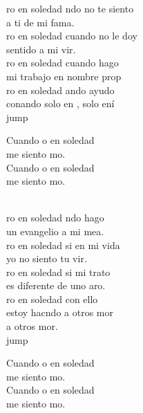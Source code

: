 \begin{cancion}%
	ro en soledad ndo no te siento \\
	a ti de mi fama.\\
	ro en soledad cuando no le doy \\
	sentido a mi vir.\\
	ro en soledad cuando hago \\
	mi trabajo en nombre prop\\
	ro en soledad ando ayudo \\
	conando solo en , solo ení\\jump\\
	\begin{chorus}%
	Cuando o en soledad \\
	me siento mo.\\
	Cuando o en soledad \\
	me siento mo. \\
	\end{chorus}%
	\jump\\
	ro en soledad ndo hago \\
	un evangelio a mi mea.\\
	ro en soledad si en mi vida\\
	yo no siento tu vir.\\
	ro en soledad si mi trato \\
	es diferente de uno aro.\\
	ro en soledad con ello \\
	estoy hacndo a otros mor \\
	a otros mor.\\jump\\
	\begin{chorus}%
	Cuando o en soledad \\
	me siento mo.\\
	Cuando o en soledad \\
	me siento mo. \\

\end{chorus}
\end{cancion}
